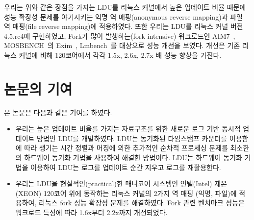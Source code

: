 우리는 위와 같은 장점을 가지는 LDU를 리눅스 커널에서 높은 업데이트 비율 때문에 성능 확장성 
문제를 야기시키는 익명 역 매핑(anonymous reverse mapping)과 파일 역 매핑(file reverse mapping)에
적용하였다.
또한 우리는 LDU를 리눅스 커널 버전 4.5.rc4에 구현하였고, Fork가 많이 발생하는(fork-intensive) 워크로드인
AIM7~\cite{AIM7Benchmark}, MOSBENCH~\cite{MOSBENCH}의 Exim~\cite{Exim},
Lmbench~\cite{mcvoy1996lmbench}를 대상으로 성능 개선을 보였다.
개선은 기존 리눅스 커널에 비해 120코어에서 각각 1.5x, 2.6x, 2.7x 배 성능 향상을 가진다.


\section{논문의 기여}\label{sec:introcontri}
본 논문은 다음과 같은 기여를 하였다.
\begin{itemize}
\item 우리는 높은 업데이트 비율를 가지는 자료구조를 위한 새로운 로그 기반 동시적 업데이트
 방법인 LDU를 개발하였다.
LDU는 동기화된 타임스탬프 카운터를 이용함에 따라 생기는 시간 정렬과 머징에 의한 추가적인
순차적 프로세싱 문제를 최소한의 하드웨어 동기화 기법을 사용하여 해결한 방법이다.
LDU는 하드웨어 동기화 기법을 이용하여 LDU는 로그를 업데이트 순간 지우고 로그를
재활용한다.
\item 
우리는 LDU을 현실적인(practical)한 매니코어 시스템인 인텔(Intel) 제온(XEON)
 120코어 위에 동작하는 리눅스 커널의 2가지 역 매핑 (익명, 파일)에 적용하여, 리눅스 fork
 성능 확장성 문제를 해결하였다.
Fork 관련 벤치마크 성능은 워크로드 특성에 따라 1.6x부터 2.2x까지 개선되었다.
\end{itemize}
